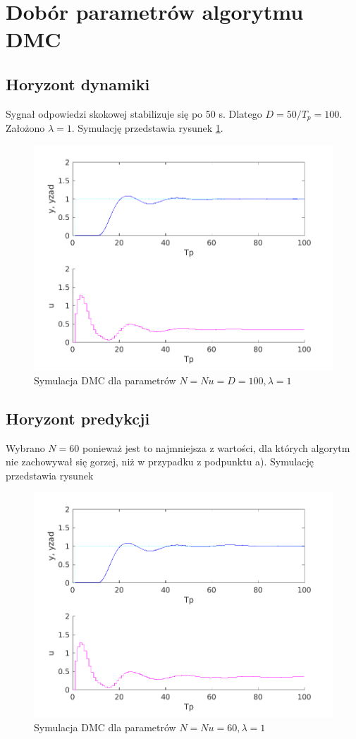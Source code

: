 \documentclass[a4paper, 10pt]{article}
\begin{document}
	\section{Dobór parametrów algorytmu DMC}
	\subsection{Horyzont dynamiki}
	Sygnał odpowiedzi skokowej stabilizuje się po 50 s. Dlatego $D = 50/T_p = 100$. Założono $\lambda = 1$. Symulację przedstawia rysunek \ref{fig:z5_100_100_100_1}. 
	\begin{figure}
		\centering
		\includegraphics[width=0.7\linewidth]{z5_100_100_100_1.png}
		\caption{Symulacja DMC dla parametrów $N=Nu=D=100, \lambda = 1$}
		\label{fig:z5_100_100_100_1}
	\end{figure}
	\subsection{Horyzont predykcji}
	Wybrano $N=60$ ponieważ jest to najmniejsza z wartości, dla których algorytm nie zachowywał się gorzej, niż w przypadku z podpunktu a). Symulację przedstawia rysunek 
	\begin{figure}
		\centering
		\includegraphics[width=0.7\linewidth]{z5_60_60_60_1.png}
		\caption{Symulacja DMC dla parametrów $N=Nu=60, \lambda = 1$}
		\label{fig:z5_60_60_60_1}
	\end{figure}
\end{document}

